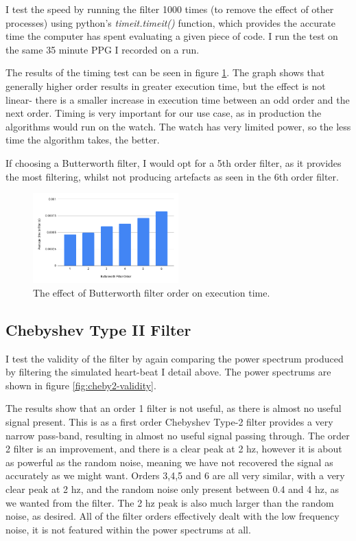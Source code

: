 \documentclass[12pt,a4paper,twoside,openright]{report}
\begin{document}
I test the speed by running the filter 1000 times (to remove the effect of
other processes) using python's
\emph{timeit.timeit()} function, which provides the accurate time the computer
has spent evaluating a given piece of code. I run the test on the same 35
minute PPG I recorded on a run. 

The results of the timing test can be seen in figure \ref{fig:butter-time}.
The graph shows that generally higher order results in greater
execution time, but the effect is not linear- there is a smaller increase
in execution time 
between an odd order and the next order. Timing is very important for our use
case, as in production the algorithms would run on the watch. The watch has
very limited power, so the less time the algorithm takes, the better.

If choosing a Butterworth filter, I would opt for a 5th order filter, as it
provides the most filtering, whilst not producing artefacts as seen in the 6th
order filter. 

\begin{figure}[tbh]
	\centerline{\includegraphics[width=0.5\textwidth]{figs/butter-time.png}}
	\caption{The effect of Butterworth filter order on execution time.}
	\label{fig:butter-time}
\end{figure}

\subsection{Chebyshev Type II Filter}

I test the validity of the filter by again comparing the power spectrum produced by
filtering the simulated heart-beat I detail above. The power spectrums are
shown in figure 
\ref{fig:cheby2-validity}. 

The results show that an order 1 filter is not useful, as there is almost no
useful signal present. This is as a first order Chebyshev Type-2 filter
provides a very narrow pass-band, resulting in almost no useful signal passing
through. The order 2 filter is an improvement, and there is a
clear peak at 2 hz, however it is about as powerful as the random noise,
meaning we have not recovered the signal as accurately as we might want. 
Orders 3,4,5 and 6 are all very
similar, with a very clear peak at 2 hz, and the random noise only present
between 0.4 and 4 hz, as we wanted from the filter. The 2 hz peak is also much
larger than the random noise, as desired. All of the filter orders effectively
dealt with the low frequency noise, it is not featured within the power
spectrums at all.
\end{document}
